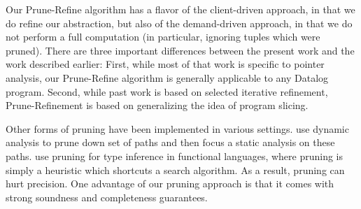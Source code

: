 Our Prune-Refine algorithm has a flavor of the client-driven approach, in that we do
refine our abstraction, but also of the demand-driven approach, in that we do
not perform a full computation (in particular, ignoring tuples which were
pruned).  There are three important differences between the present work
and the work described earlier:
First, while most of that work is specific to pointer analysis, our Prune-Refine algorithm
is generally applicable to any Datalog program.
Second, while past work is based on selected iterative refinement,
Prune-Refinement is based on generalizing the idea of program slicing.


%



Other forms of pruning have been implemented in various settings.
\cite{vipindeep05pruning} use dynamic analysis to prune down set of paths and
then focus a static analysis on these paths.
\cite{spoon04ddp} use pruning for type inference in functional languages,
where pruning is simply a heuristic which shortcuts a search algorithm.
As a result, pruning can hurt precision.
One advantage of our pruning approach is that it comes with strong soundness
and completeness guarantees.

